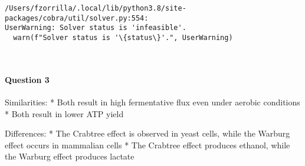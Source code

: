 \documentclass[11pt]{article}
\begin{document}
    \begin{Verbatim}[commandchars=\\\{\}]
/Users/fzorrilla/.local/lib/python3.8/site-packages/cobra/util/solver.py:554:
UserWarning: Solver status is 'infeasible'.
  warn(f"Solver status is '\{status\}'.", UserWarning)
    \end{Verbatim}

    \begin{center}
    \end{center}
    { \hspace*{\fill} \\}
    
    \hypertarget{question-3}{%
\paragraph{Question 3}\label{question-3}}

Similarities: * Both result in high fermentative flux even under aerobic
conditions * Both result in lower ATP yield

Differences: * The Crabtree effect is observed in yeast cells, while the
Warburg effect occurs in mammalian cells * The Crabtree effect produces
ethanol, while the Warburg effect produces lactate


    
    
    
\end{document}
